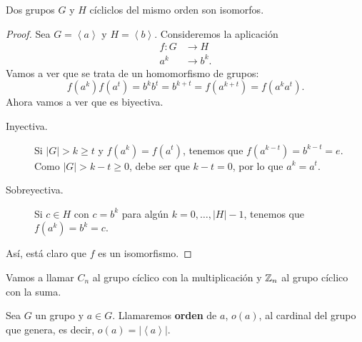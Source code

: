 \begin{prop}
Dos grupos $\displaystyle G $ y $\displaystyle H $ cícliclos del mismo orden son isomorfos.
\end{prop}
\begin{proof}
Sea $\displaystyle G = \left\langle a \right\rangle  $ y $\displaystyle H = \left\langle b \right\rangle  $. Consideremos la aplicación
\[
\begin{split}
	f : G & \to H \\
	a^{k} & \to b^{k}.
\end{split}
\]
Vamos a ver que se trata de un homomorfismo de grupos:
\[f\left(a^{k}\right)f\left(a^{t}\right) = b^{k}b^{t} = b^{k+t} = f\left(a^{k+t}\right) = f\left(a^{k}a^{t}\right) .\]
Ahora vamos a ver que es biyectiva. 
\begin{description}
\item[Inyectiva.] Si $\displaystyle \left|G\right| > k \geq t $ y $\displaystyle f\left(a^{k}\right) = f\left(a^{t}\right) $, tenemos que $\displaystyle f\left(a^{k-t}\right) = b^{k -t} = e $. Como $\displaystyle \left|G\right|>k - t \geq 0 $, debe ser que $\displaystyle k - t = 0 $, por lo que $\displaystyle a^{k} = a^{t} $.
\item[Sobreyectiva.]  Si $\displaystyle c \in H $ con $\displaystyle c = b^{k} $ para algún $\displaystyle k = 0, \ldots, \left|H\right|-1 $, tenemos que $\displaystyle f\left(a^{k}\right)= b^{k} = c $.
\end{description}
Así, está claro que $\displaystyle f $ es un isomorfismo.
\end{proof}
\begin{notation}
Vamos a llamar $\displaystyle C_{n} $ al grupo cíclico con la multiplicación y $\displaystyle \mathbb{Z}_{n} $ al grupo cíclico con la suma. 
\end{notation}
\begin{definition}
Sea $\displaystyle G $ un grupo y $\displaystyle a \in G $. Llamaremos \textbf{orden} de $\displaystyle a $, $\displaystyle o\left(a\right) $, al cardinal del grupo que genera, es decir, $\displaystyle o\left(a\right) = \left|\left\langle a \right\rangle \right| $.
\end{definition}
